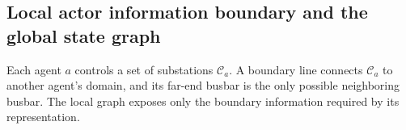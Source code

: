 


\subsection{Local actor information boundary and the global state graph}
\label{subsec:graph-local-global}

Each agent $a$ controls a set of substations $\mathcal{C}_a$. A
boundary line connects $\mathcal{C}_a$ to another agent's domain, and
its far-end busbar is the only possible neighboring busbar. The local graph
exposes only the boundary information required by its representation.

